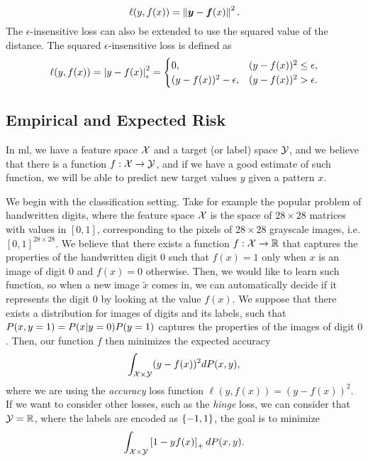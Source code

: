 \begin{equation}
    \label{eq:sqmulti_def}
    \lossf(y, f(x)) =  \norm{\fv{y} - \fv{f}(x)}^2.
\end{equation}
%
The $\epsilon$-insensitive loss can also be extended to use the squared value of the distance. The squared $\epsilon$-insensitive loss is defined as
\begin{equation}
    \label{eq:sqepsins_def}
    \lossf(y, f(x)) = \abs{y - f(x)}^2_\epsilon =
    \begin{cases}
        0, & (y - f(x))^2 \leq \epsilon ,\\
        (y - f(x))^2 - \epsilon, & (y - f(x))^2 > \epsilon .\\
    \end{cases}
\end{equation} 

\subsection{Empirical and Expected Risk} 
In \acrshort{ml}, we have a feature space $\mathcal{X}$ and a target (or label) space $\mathcal{Y}$, and we believe that there is a function $f: \mathcal{X} \to \mathcal{Y}$, and if we have a good estimate of such function, we will be able to predict new target values $y$ given a pattern $x$. 

%
We begin with the classification setting. Take for example the popular problem  of handwritten digits, where the feature space $\mathcal{X}$ is the space of $28 \times 28$ matrices with values in $[0, 1]$, corresponding to the pixels of $28 \times 28$ grayscale images, i.e. $[0, 1]^{28 \times 28}$. We believe that there exists a function $f: \mathcal{X} \to \mathbb{R}$ that captures the properties of the handwritten digit $0$ such that $f(x)=1$ only when $x$ is an image of digit $0$ and $f(x)=0$ otherwise. Then, we would like to learn such function, so when a new image $\tilde{x}$ comes in, we can automatically decide if it represents the digit $0$ by looking at the value $f(x)$.
%
We suppose that there exists a distribution for images of digits and its labels, such that $P(x, y=1) = P(x \vert y = 0) P(y = 1)$ captures the properties of the images of digit $0$. Then, our function $f$ then minimizes the expected accuracy
$$ \int_{\mathcal{X} \times \mathcal{Y}} (y - f(x))^2 dP(x, y) ,$$
where we are using the \emph{accuracy} loss function $\ell(y, f(x)) = (y - f(x))^2$. 
%
If we want to consider other losses, such as the \emph{hinge} loss, we can consider that $\mathcal{Y} = \mathbb{R}$, where the labels are encoded as $\left\{-1, 1\right\}$, the goal is to minimize 
$$ \int_{\mathcal{X} \times \mathcal{Y}} \left[1 - y f(x)\right]_{+} dP(x, y) .$$


